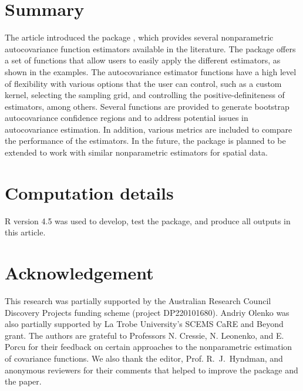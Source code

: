 \section{Summary}
The article introduced the package , which provides several nonparametric autocovariance function estimators available in the literature. The package offers a set of functions that allow users to easily apply the different estimators, as shown in the examples. The autocovariance estimator functions have a high level of flexibility with various options that the user can control, such as a custom kernel, selecting the sampling grid, and controlling the positive-definiteness of estimators, among others. Several functions are provided to generate bootstrap autocovariance confidence regions and to address potential issues in autocovariance estimation. In addition, various metrics are included to compare the performance of the estimators.
In the future, the package is planned to be extended to work with similar nonparametric estimators for spatial data.

\section{Computation details}
R version 4.5 was used to develop, test the package, and produce all outputs in this article.

\section{Acknowledgement}
This research was partially supported by the Australian Research Council Discovery Projects funding scheme (project DP220101680). Andriy Olenko was also partially supported by La Trobe University's SCEMS CaRE and Beyond grant. The authors are grateful to Professors N. Cressie, N. Leonenko, and E. Porcu for their feedback on certain approaches to the nonparametric estimation of covariance functions.
We also thank the editor, Prof. R.~J.~Hyndman, and anonymous reviewers for their comments that helped to improve the package and the paper.



\address{Adam Bilchouris\\
  Department of Mathematical and Physical Sciences\\
  La Trobe University\\
  Australia\\
  ORCiD: 0009-0002-4649-0247\\
  }

\address{Andriy Olenko\\
  Department of Mathematical and Physical Sciences\\
  La Trobe University\\
  Australia\\
  ORCiD: 0000-0002-0917-7000\\
  }
